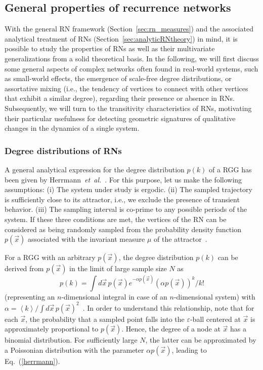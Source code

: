 	\subsection{General properties of recurrence networks}
		With the general RN framework (Section~\ref{sec:rn_measures}) and the associated analytical treatment of RNs (Section~\ref{sec:analyticRNtheory}) in mind, it is possible to study the properties of RNs as well as their multivariate generalizations from a solid theoretical basis. In the following, we will first discuss some general aspects of complex networks often found in real-world systems, such as small-world effects, the emergence of scale-free degree distributions, or assortative mixing (i.e., the tendency of vertices to connect with other vertices that exhibit a similar degree), regarding their presence or absence in RNs. Subsequently, we will turn to the transitivity characteristics of RNs, motivating their particular usefulness for detecting geometric signatures of qualitative changes in the dynamics of a single system.

       		\subsubsection{Degree distributions of RNs} \label{sec:scaling}
		A general analytical expression for the degree distribution $p(k)$ of a RGG has been given by Herrmann~\textit{et~al.}~\cite{Herrmann2003}. For this purpose, let us make the following assumptions: (i) The system under study is ergodic. (ii) The sampled trajectory is sufficiently close to its attractor, i.e., we exclude the presence of transient behavior. (iii) The sampling interval is co-prime to any possible periods of the system. If these three conditions are met, the vertices of the RN can be considered as being randomly sampled from the probability density function $p(\vec{x})$ associated with the invariant measure $\mu$ of the attractor~\cite{Eckmann1985}.

		For a RGG with an arbitrary $p(\vec{x})$, the degree distribution $p(k)$ can be derived from $p(\vec{x})$ in the limit of large sample size $N$ as
\begin{equation}\label{herrmann}
  p(k) = \int d\vec{x}\,p(\vec{x}) e^{-\alpha p(\vec{x})}(\alpha p(\vec{x}))^k/k!
\end{equation}
(representing an $n$-dimensional integral in case of an $n$-dimensional system) with $\alpha = \left<k\right> / \int d\vec{x}\,p(\vec{x})^2$~\cite{Herrmann2003}. In order to understand this relationship, note that for each $\vec{x}$, the probability that a sampled point falls into the $\varepsilon$-ball centered at $\vec{x}$ is approximately proportional to $p(\vec{x})$. Hence, the degree of a node at $\vec{x}$ has a binomial distribution. For sufficiently large $N$, the latter can be approximated by a Poissonian distribution with the parameter $\alpha p(\vec{x})$, leading to Eq.~(\ref{herrmann}).

